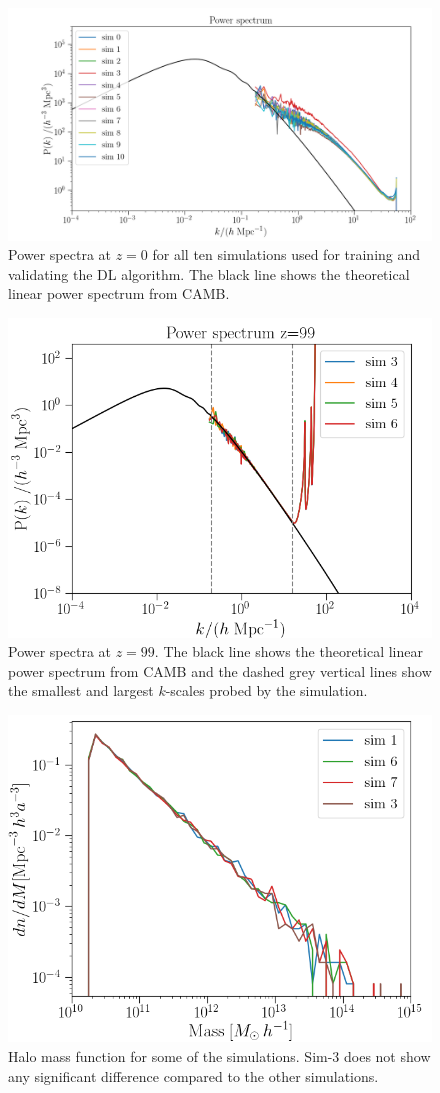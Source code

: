 \documentclass[11pt]{article}
\begin{document}
\begin{figure}[t]
\centering
\includegraphics[width=\columnwidth]{Pk_sims}
\caption{Power spectra at $z=0$ for all ten simulations used for training and validating the DL algorithm. The black line shows the theoretical linear power spectrum from CAMB.}
\label{fig:Pk_z0}
\end{figure}

\begin{figure}[t]
\centering
\includegraphics[width=0.7\columnwidth]{Pk_sims_z_99}
\caption{Power spectra at $z=99$. The black line shows the theoretical linear power spectrum from CAMB and the dashed grey vertical lines show the smallest and largest $k$-scales probed by the simulation.}
\label{fig:Pk_z99}
\end{figure}

\begin{figure}[t]
\centering
\includegraphics[width=0.7\columnwidth]{HMFs}
\caption{Halo mass function for some of the simulations. Sim-3 does not show any significant difference compared to the other simulations.}
\label{fig:Pk_z99}
\end{figure}
\end{document}
